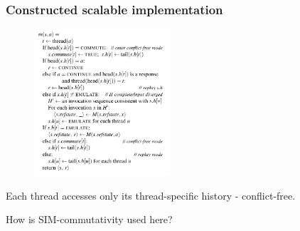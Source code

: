 \documentclass{beamer}
\begin{document}
\begin{frame}
\frametitle{Constructed scalable implementation}
\begin{multicols}{2}
\begin{figure}
   \includegraphics[width=0.45\textwidth]{799-s14-docs/scalable_imple.png}
 \end{figure}
\columnbreak
Each thread accesses only its thread-specific history - conflict-free.
\end{multicols}

How is SIM-commutativity used here?

\end{frame}
\end{document}

